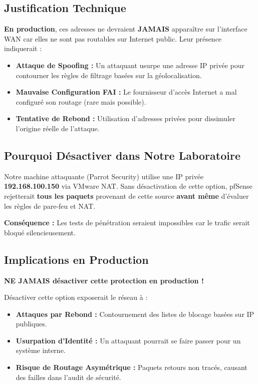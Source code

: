 \documentclass[12pt,a4paper,openany]{report}
\begin{document}
	\subsection{Justification Technique}
	\textbf{En production}, ces adresses ne devraient \textbf{JAMAIS} apparaître sur l'interface WAN car elles ne sont pas routables sur Internet public. Leur présence indiquerait :
	\begin{itemize}
		\item \textbf{Attaque de Spoofing :} Un attaquant usurpe une adresse IP privée pour contourner les règles de filtrage basées sur la géolocalisation.
		\item \textbf{Mauvaise Configuration FAI :} Le fournisseur d'accès Internet a mal configuré son routage (rare mais possible).
		\item \textbf{Tentative de Rebond :} Utilisation d'adresses privées pour dissimuler l'origine réelle de l'attaque.
	\end{itemize}
	
	\subsection{Pourquoi Désactiver dans Notre Laboratoire}
	Notre machine attaquante (Parrot Security) utilise une IP privée \textbf{192.168.100.150} via VMware NAT. Sans désactivation de cette option, pfSense rejetterait \textbf{tous les paquets} provenant de cette source \textbf{avant même} d'évaluer les règles de pare-feu et NAT.
	
	\textbf{Conséquence :} Les tests de pénétration seraient impossibles car le trafic serait bloqué silencieusement.
	
	\subsection{Implications en Production}
	\begin{tcolorbox}[colback=accent!5!white, colframe=accent, title=\textbf{AVERTISSEMENT CRITIQUE}]
		\textbf{NE JAMAIS désactiver cette protection en production !}
		
		Désactiver cette option exposerait le réseau à :
		\begin{itemize}
			\item \textbf{Attaques par Rebond :} Contournement des listes de blocage basées sur IP publiques.
			\item \textbf{Usurpation d'Identité :} Un attaquant pourrait se faire passer pour un système interne.
			\item \textbf{Risque de Routage Asymétrique :} Paquets retours non tracés, causant des failles dans l'audit de sécurité.
		\end{itemize}
	\end{tcolorbox}
	
\end{document}
